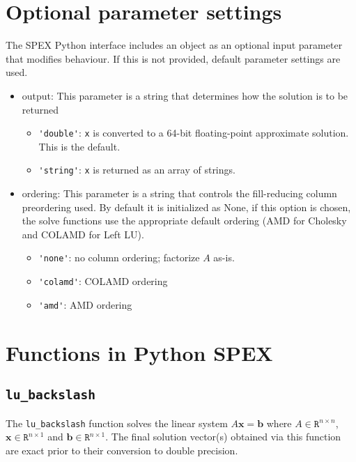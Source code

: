 \documentclass[12pt,oneside]{book}
\theoremstyle{definition}
\renewcommand{\b}{\mathbf{b}}
\newcommand{\x}{\mathbf{x}}
\begin{document}
\section{Optional parameter settings}\label{s:Python:option}
The SPEX Python interface includes an object as an optional input parameter that modifies behaviour. If this is not provided, default parameter settings are used.
\begin{itemize}
    \item output: This parameter is a string that determines how the solution is to be returned
    \begin{itemize}
        \item \verb|'double'|:  \verb|x| is converted to a 64-bit
            floating-point approximate solution.  This is the default.
        \item \verb|'string'|:  \verb|x| is returned as an array of strings.
    \end{itemize}
    \item ordering: This parameter is a string that controls the fill-reducing column preordering used. By default it is initialized as None, if this option is chosen, the solve functions use the appropriate default ordering (AMD for Cholesky and COLAMD for Left LU).
        \begin{itemize}
            \item \verb|'none'|: no column ordering; factorize $A$ as-is.
            \item \verb|'colamd'|: COLAMD ordering 
            \item \verb|'amd'|: AMD ordering 
        \end{itemize}
\end{itemize}


\section{Functions in Python SPEX}\label{s:Python:Funcs}

\subsection{\texttt{lu\_backslash}}
The \verb|lu_backslash| function solves the linear system $A\x=\b$ where $A \in \mathtt{R}^{n \times n}$, $\x \in \mathtt{R}^{n \times 1}$ and $\b \in \mathtt{R}^{n \times 1}$. The final solution vector(s) obtained via this function are exact prior to their conversion to double precision. 
\end{document}
